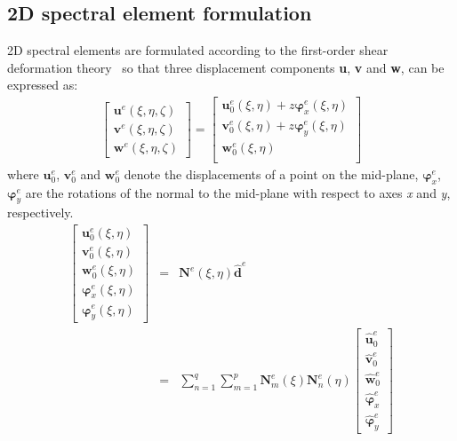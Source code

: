 \documentclass[a4paper,12pt]{article}
\begin{document}
\subsection{2D spectral element formulation}
\label{sec:2D_SEM}
2D spectral elements are formulated according to the first-order shear 
deformation theory~\cite{reissner1945effect, mindlin1951influence} so that 
three displacement components \textbf{u}, \textbf{v} and \textbf{w}, can be 
expressed as:
\begin{eqnarray}
\left [ \begin{array}{c}
\textbf{u}^e(\xi,\eta,\zeta) \\
\textbf{v}^e(\xi,\eta,\zeta) \\
\textbf{w}^e(\xi,\eta,\zeta)
\end{array} \right] = 
\left [ \begin{array}{c}
\textbf{u}_0^e(\xi,\eta) + z\boldsymbol{\varphi}_x^e(\xi,\eta)\\
\textbf{v}_0^e(\xi,\eta) + z\boldsymbol{\varphi}_y^e(\xi,\eta)\\
\textbf{w}_0^e(\xi,\eta) \\
\end{array} \right]
\end{eqnarray}
where $\textbf{u}_0^e$, $\textbf{v}_0^e$ and $\textbf{w}_0^e$ denote the 
displacements of a point on the mid-plane, $\boldsymbol{\varphi}_x^e$, 
$\boldsymbol{\varphi}_y^e$ are the rotations of the normal to the mid-plane 
with respect to axes \textit{x} and \textit{y}, respectively.
\begin{eqnarray}
\left [ \begin{array}{c}
\textbf{u}_0^e(\xi,\eta) \\
\textbf{v}_0^e(\xi,\eta) \\
\textbf{w}_0^e(\xi,\eta) \\
\boldsymbol{\varphi}_x^e(\xi,\eta) \\
\boldsymbol{\varphi}_y^e(\xi,\eta)
\end{array} \right]
& = & \textbf{N}^e(\xi,\eta)\widehat{\textbf{d}}^e\nonumber\\
& = & \sum_{n=1}^q\sum_{m=1}^p\textbf{N}_m^e(\xi)\textbf{N}_n^e(\eta)
\left [ \begin{array}{c}
\widehat{\textbf{u}}_0^e \\
\widehat{\textbf{v}}_0^e \\
\widehat{\textbf{w}}_0^e \\
\widehat{\boldsymbol{\varphi}}_x^e \\
\widehat{\boldsymbol{\varphi}}_y^e
\end{array} \right]
\end{eqnarray}
\end{document}
